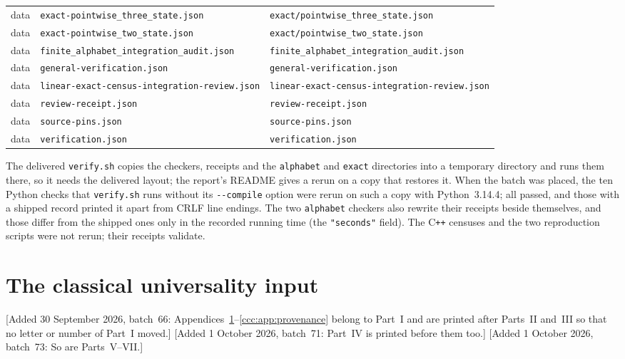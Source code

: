 \documentclass[11pt,letterpaper]{article}
\theoremstyle{definition}
\theoremstyle{remark}
\newcommand{\wadd}[1]{\textup{[}Added 30 September 2026, batch~66: #1\textup{]}}
\newcommand{\waddsevone}[1]{\textup{[}Added 1 October 2026, batch~71: #1\textup{]}}
\newcommand{\waddsevthree}[1]{\textup{[}Added 1 October 2026, batch~73: #1\textup{]}}
\begin{document}
{\begin{longtable}{@{}P{.06\textwidth}P{.46\textwidth}P{.42\textwidth}@{}}
data & \nolinkurl{exact-pointwise_three_state.json} & \nolinkurl{exact/pointwise_three_state.json}\\
data & \nolinkurl{exact-pointwise_two_state.json} & \nolinkurl{exact/pointwise_two_state.json}\\
data & \nolinkurl{finite_alphabet_integration_audit.json} & \nolinkurl{finite_alphabet_integration_audit.json}\\
data & \nolinkurl{general-verification.json} & \nolinkurl{general-verification.json}\\
data & \nolinkurl{linear-exact-census-integration-review.json} & \nolinkurl{linear-exact-census-integration-review.json}\\
data & \nolinkurl{review-receipt.json} & \nolinkurl{review-receipt.json}\\
data & \nolinkurl{source-pins.json} & \nolinkurl{source-pins.json}\\
data & \nolinkurl{verification.json} & \nolinkurl{verification.json}\\
\bottomrule
\end{longtable}}
\noindent The delivered \texttt{verify.sh} copies the checkers, receipts and
the \texttt{alphabet} and \texttt{exact} directories into a temporary
directory and runs them there, so it needs the delivered layout; the
report's README gives a rerun on a copy that restores it. When the batch was
placed, the ten Python checks that \texttt{verify.sh} runs without its
\texttt{-{}-compile} option were rerun on such a copy with Python~3.14.4;
all passed, and those with a shipped record printed it apart from CRLF line
endings. The two \texttt{alphabet} checkers also rewrite their receipts
beside themselves, and those differ from the shipped ones only in the
recorded running time (the \texttt{"seconds"} field). The C\texttt{++}
censuses and the two reproduction scripts were not rerun; their receipts
validate.


\clearpage
{}
\appendix
\section{The classical universality input}\label{ccc:app:universality}

\wadd{Appendices~\ref{ccc:app:universality}--\ref{ccc:app:provenance}
belong to Part~I and are printed after Parts~II and~III so that no letter or
number of Part~I moved.}
\waddsevone{Part~IV is printed before them too.}
\waddsevthree{So are Parts~V--VII.}
\end{document}
